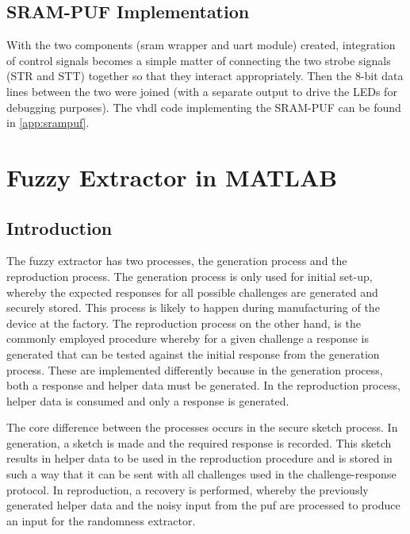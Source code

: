 \subsection{SRAM-PUF Implementation}

With the two components (\gls{sram} wrapper and \gls{uart} module) created,
integration of control signals becomes a simple matter of connecting the two strobe
signals (STR and STT) together so that they interact appropriately. Then the 8-bit
data lines between the two were joined (with a separate output to drive the LEDs for
debugging purposes). The \gls{vhdl} code implementing the SRAM-PUF can be found in
\autoref{app:srampuf}.

\section{Fuzzy Extractor in MATLAB}

\subsection{Introduction}

The fuzzy extractor has two processes, the generation process and the
reproduction process.
The generation process is only used for initial set-up, whereby the expected
responses for all possible challenges are generated and securely stored.
This process is likely to happen during manufacturing of the device at the
factory.
The reproduction process on the other hand, is the commonly employed procedure
whereby for a given challenge a response is generated that can be tested against
the initial response from the generation process.
These are implemented differently because in the generation process, both a
response and helper data must be generated. In the reproduction process, helper
data is consumed and only a response is generated.

The core difference between the processes occurs in the secure sketch process.
In generation, a sketch is made and the required response is recorded. This
sketch results in helper data to be used in the reproduction procedure and is
stored in such a way that it can be sent with all challenges used in the
challenge-response protocol. In reproduction, a recovery is performed,
whereby the previously generated helper data and the noisy input from the \gls{puf}
are processed to produce an input for the randomness extractor.

